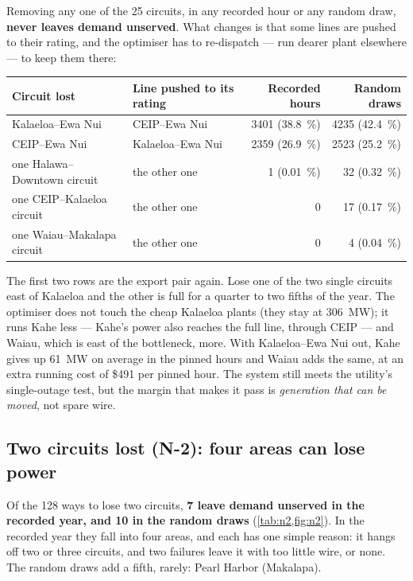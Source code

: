 \documentclass[11pt,a4paper]{article}
\begin{document}
Removing any one of the 25 circuits, in any recorded hour or any random draw,
\textbf{never leaves demand unserved}. What changes is that some lines are pushed to
their rating, and the optimiser has to re-dispatch --- run dearer plant elsewhere ---
to keep them there:

\begin{center}
\small
\begin{tabular}{@{}llrr@{}}
\toprule
\textbf{Circuit lost} & \textbf{Line pushed to its rating} &
  \textbf{Recorded hours} & \textbf{Random draws} \\
\midrule
Kalaeloa--Ewa Nui          & CEIP--Ewa Nui      & \num{3401} (\SI{38.8}{\percent}) & \num{4235} (\SI{42.4}{\percent}) \\
CEIP--Ewa Nui              & Kalaeloa--Ewa Nui  & \num{2359} (\SI{26.9}{\percent}) & \num{2523} (\SI{25.2}{\percent}) \\
one Halawa--Downtown circuit & the other one    & 1 (\SI{0.01}{\percent})          & 32 (\SI{0.32}{\percent}) \\
one CEIP--Kalaeloa circuit & the other one      & 0                                & 17 (\SI{0.17}{\percent}) \\
one Waiau--Makalapa circuit & the other one     & 0                                & 4 (\SI{0.04}{\percent}) \\
\bottomrule
\end{tabular}
\end{center}

\noindent The first two rows are the export pair again. Lose one of the two single
circuits east of Kalaeloa and the other is full for a quarter to two fifths of the year.
The optimiser does not touch the cheap Kalaeloa plants (they stay at \SI{306}{MW});
it runs Kahe less --- Kahe's power also reaches the full line, through CEIP --- and
Waiau, which is east of the bottleneck, more. With Kalaeloa--Ewa Nui out, Kahe gives up
\SI{61}{MW} on average in the pinned hours and Waiau adds the same, at an extra running
cost of \$491 per pinned hour. The system still meets the utility's single-outage
test, but the margin that makes it pass is \emph{generation that can be moved}, not
spare wire.

\subsection{Two circuits lost (N-2): four areas can lose power}

Of the 128 ways to lose two circuits, \textbf{7 leave demand unserved in the recorded
year, and 10 in the random draws} (\cref{tab:n2,fig:n2}). In the recorded year they
fall into four areas, and each has one simple reason: it hangs off two or three
circuits, and two failures leave it with too little wire, or none. The random draws
add a fifth, rarely: Pearl Harbor (Makalapa).
\end{document}
